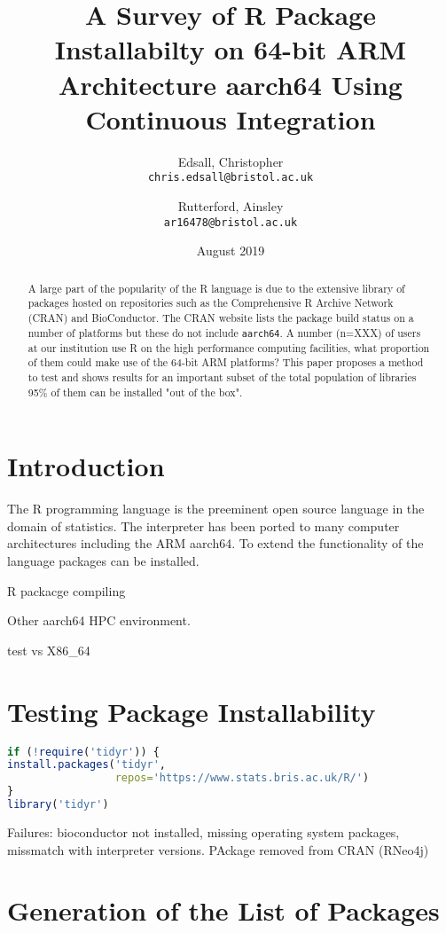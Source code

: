 \documentclass{article}
\title{A Survey of R Package Installabilty on 64-bit ARM Architecture aarch64 Using Continuous Integration}
\author{Edsall, Christopher\\
  \texttt{chris.edsall@bristol.ac.uk}
  \and
  Rutterford, Ainsley\\
  \texttt{ar16478@bristol.ac.uk}
}
\date{August 2019}
\begin{document}
\maketitle

\begin{abstract}
 A large part of the popularity of the R language is due to the extensive library of packages hosted on repositories such as the Comprehensive R Archive Network (\textsc{CRAN}) and BioConductor. The \textsc{CRAN} website lists the package build status on a number of platforms but these do not include \texttt{aarch64}. A number (n=XXX) of users at our institution use R on the high performance computing facilities, what proportion of them could make use of the 64-bit ARM platforms? This paper proposes a method to test and shows results for an important subset of the total population of libraries 95\% of them can be installed "out of the box". 
\end{abstract}

\section{Introduction}

The R programming language\cite{R:Ihaka+Gentleman:1996} is the preeminent open source language in the domain of statistics\cite{muenchen2012popularity}. The interpreter has been ported to many computer architectures including the \textsc{ARM} aarch64. To extend the functionality of the language packages can be installed. 

R packacge compiling

Other aarch64 HPC environment.

test vs X86\_64


\section{Testing Package Installability}

\begin{lstlisting}[language=R, caption=Testing that package \texttt{tidyr} can be installed and loaded]
if (!require('tidyr')) {
install.packages('tidyr',
                 repos='https://www.stats.bris.ac.uk/R/')
}
library('tidyr')
\end{lstlisting}

Failures: bioconductor not installed, missing operating system packages, missmatch with interpreter versions. PAckage removed from CRAN (RNeo4j)

\section{Generation of the List of Packages}
\end{document}
